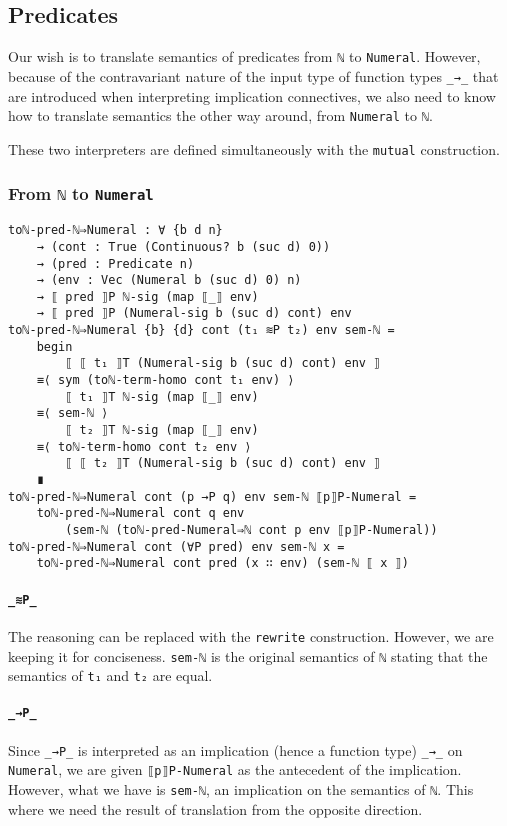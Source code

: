 \documentclass[\main/thesis.tex]{subfiles}
\begin{document}
\subsection{Predicates}

Our wish is to translate semantics of predicates from \lstinline|ℕ| to
\lstinline|Numeral|.
However, because of the contravariant nature of the input type of function types
\lstinline|_→_| that are introduced when interpreting implication connectives,
we also need to know how to translate semantics the other way around,
from \lstinline|Numeral| to \lstinline|ℕ|.

These two interpreters are defined simultaneously with the \lstinline|mutual|
construction.

\subsubsection{From \lstinline|ℕ| to \lstinline|Numeral|}

\begin{lstlisting}
toℕ-pred-ℕ⇒Numeral : ∀ {b d n}
    → (cont : True (Continuous? b (suc d) 0))
    → (pred : Predicate n)
    → (env : Vec (Numeral b (suc d) 0) n)
    → ⟦ pred ⟧P ℕ-sig (map ⟦_⟧ env)
    → ⟦ pred ⟧P (Numeral-sig b (suc d) cont) env
toℕ-pred-ℕ⇒Numeral {b} {d} cont (t₁ ≋P t₂) env sem-ℕ =
    begin
        ⟦ ⟦ t₁ ⟧T (Numeral-sig b (suc d) cont) env ⟧
    ≡⟨ sym (toℕ-term-homo cont t₁ env) ⟩
        ⟦ t₁ ⟧T ℕ-sig (map ⟦_⟧ env)
    ≡⟨ sem-ℕ ⟩
        ⟦ t₂ ⟧T ℕ-sig (map ⟦_⟧ env)
    ≡⟨ toℕ-term-homo cont t₂ env ⟩
        ⟦ ⟦ t₂ ⟧T (Numeral-sig b (suc d) cont) env ⟧
    ∎
toℕ-pred-ℕ⇒Numeral cont (p →P q) env sem-ℕ ⟦p⟧P-Numeral =
    toℕ-pred-ℕ⇒Numeral cont q env
        (sem-ℕ (toℕ-pred-Numeral⇒ℕ cont p env ⟦p⟧P-Numeral))
toℕ-pred-ℕ⇒Numeral cont (∀P pred) env sem-ℕ x =
    toℕ-pred-ℕ⇒Numeral cont pred (x ∷ env) (sem-ℕ ⟦ x ⟧)
\end{lstlisting}

\paragraph{\lstinline|_≋P_|}
The reasoning can be replaced with the \lstinline|rewrite| construction.
However, we are keeping it for conciseness.
\lstinline|sem-ℕ| is the original semantics of \lstinline|ℕ| stating that
the semantics of \lstinline|t₁| and \lstinline|t₂| are equal.

\paragraph{\lstinline|_→P_|}
Since \lstinline|_→P_| is interpreted as an implication (hence a function type)
\lstinline|_→_| on \lstinline|Numeral|, we are given \lstinline|⟦p⟧P-Numeral|
as the antecedent of the implication.
However, what we have is \lstinline|sem-ℕ|, an implication on the
semantics of \lstinline|ℕ|.
This where we need the result of translation from the opposite direction.
\end{document}
